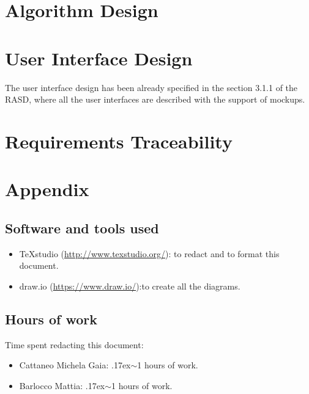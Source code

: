 \documentclass[18pt,oneside,a4paper, titlepage]{article}
\begin{document}
	\section{Algorithm Design}
		
	\section{User Interface Design}
		The user interface design has been already specified in the section 3.1.1 of the RASD, where all the user interfaces are described with the support of mockups.
		
	\section{Requirements Traceability}

	\section{Appendix}
		\subsection{Software and tools used}
				\begin{itemize}
					\item TeXstudio (\url{http://www.texstudio.org/}): to redact and to format this document.
					\item draw.io (\url{https://www.draw.io/}):to create all the diagrams.
				\end{itemize}
		\subsection{Hours of work}
			Time spent redacting this document:
			\begin{itemize}
				\item Cattaneo Michela Gaia: {\raise.17ex\hbox{$\scriptstyle\sim$}}1 hours of work.
				\item Barlocco Mattia: {\raise.17ex\hbox{$\scriptstyle\sim$}}1 hours of work.
			\end{itemize}
		
		
		
\end{document}
